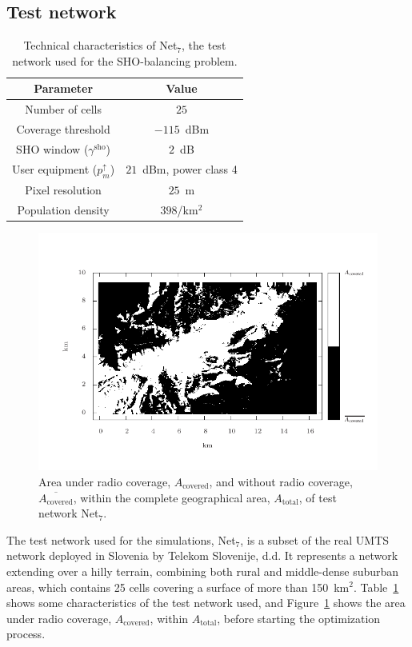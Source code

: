 \subsection{Test network}

\begin{table}
\caption{Technical characteristics of Net$_{7}$, the test network used for
the SHO-balancing problem. \label{tab:07-Test_network_properties}}


\centering

\begin{tabular}{cc}
\hline 
Parameter & Value\tabularnewline
\hline 
Number of cells & $25$\tabularnewline
Coverage threshold & $-115$~dBm\tabularnewline
SHO window ($\gamma^{\mathrm{sho}}$) & $2$~dB\tabularnewline
User equipment ($p_{m}^{\uparrow}$) & $21$~dBm, power class 4\tabularnewline
Pixel resolution & $25$~m\tabularnewline
Population density & $398$/km$^{2}$\tabularnewline
\hline 
\end{tabular}
\end{table}


\begin{figure}
\centering

\includegraphics[width=1\textwidth]{07-experimental_evaluation-sho_balancing/img/coverage_area}

\caption{Area under radio coverage, $A_{\mathrm{covered}}$, and without radio
coverage, $\overline{A_{\mathrm{covered}}}$, within the complete
geographical area, $A_{\mathrm{total}}$, of test network Net$_{7}$.\label{fig:07-Coverage_areas}}
\end{figure}


\noindent The test network used for the simulations, Net$_{7}$, is
a subset of the real UMTS network deployed in Slovenia by Telekom
Slovenije, d.d. It represents a network extending over a hilly terrain,
combining both rural and middle-dense suburban areas, which contains
25 cells covering a surface of more than 150~km$^{2}$. Table~\ref{tab:07-Test_network_properties}
shows some characteristics of the test network used, and Figure~\ref{fig:07-Coverage_areas}
shows the area under radio coverage, $A_{\mathrm{covered}}$, within
$A_{\mathrm{total}}$, before starting the optimization process.


